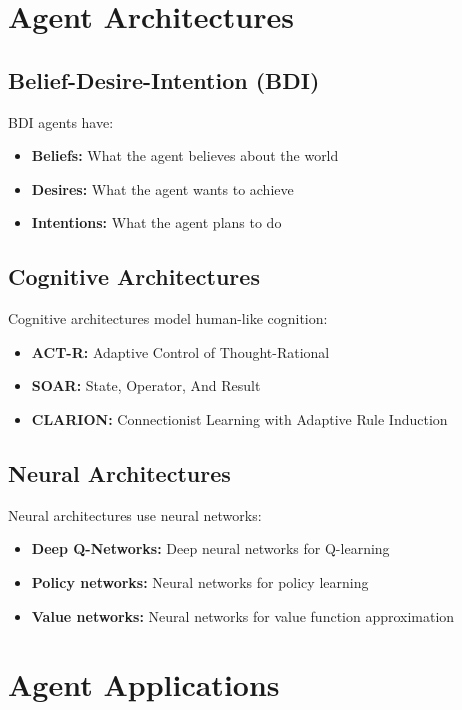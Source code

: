 \section{Agent Architectures}

\subsection{Belief-Desire-Intention (BDI)}

BDI agents have:
\begin{itemize}
    \item \textbf{Beliefs:} What the agent believes about the world
    \item \textbf{Desires:} What the agent wants to achieve
    \item \textbf{Intentions:} What the agent plans to do
\end{itemize}

\subsection{Cognitive Architectures}

Cognitive architectures model human-like cognition:
\begin{itemize}
    \item \textbf{ACT-R:} Adaptive Control of Thought-Rational
    \item \textbf{SOAR:} State, Operator, And Result
    \item \textbf{CLARION:} Connectionist Learning with Adaptive Rule Induction
\end{itemize}

\subsection{Neural Architectures}

Neural architectures use neural networks:
\begin{itemize}
    \item \textbf{Deep Q-Networks:} Deep neural networks for Q-learning
    \item \textbf{Policy networks:} Neural networks for policy learning
    \item \textbf{Value networks:} Neural networks for value function approximation
\end{itemize}

\section{Agent Applications}

